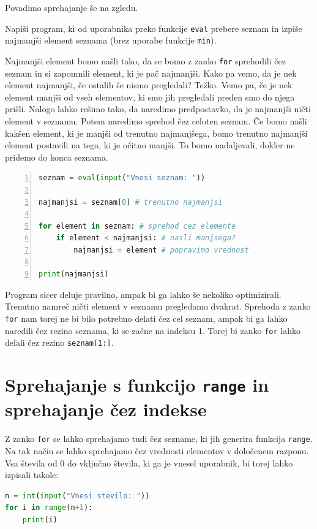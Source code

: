 Povadimo sprehajanje še na zgledu.
\begin{zgled}
Napiši program, ki od uporabnika preko funkcije \texttt{eval} prebere seznam in izpiše najmanjši element seznama (brez uporabe funkcije \texttt{min}). 
\end{zgled}
\begin{resitev}
Najmanjši element bomo našli tako, da se bomo z zanko \texttt{for} sprehodili čez seznam in si zapomnili element, ki je pač najmanjši. Kako pa vemo, da je nek element najmanjši, če ostalih še nismo pregledali? Težko. Vemo pa, če je nek element manjši od vseh elementov, ki smo jih pregledali preden smo do njega prišli. Nalogo lahko rešimo tako, da naredimo predpostavko, da je najmanjši ničti element v seznamu. Potem naredimo sprehod čez celoten seznam. Če bomo našli kakšen element, ki je manjši od trenutno najmanjšega, bomo trenutno najmanjši element postavili na tega, ki je očitno manjši. To bomo nadaljevali, dokler ne pridemo do konca seznama.
\begin{lstlisting}[language=Python, showstringspaces=false,numbers=left]
seznam = eval(input("Vnesi seznam: "))

najmanjsi = seznam[0] # trenutno najmanjsi

for element in seznam: # sprehod cez elemente
    if element < najmanjsi: # nasli manjsega?
        najmanjsi = element # popravimo vrednost

print(najmanjsi)
\end{lstlisting}
Program sicer deluje pravilno, ampak bi ga lahko še nekoliko optimizirali. Trenutno namreč ničti element v seznamu pregledamo dvakrat. Sprehoda z zanko \texttt{for} nam torej ne bi bilo potrebno delati čez cel seznam, ampak bi ga lahko naredili čez rezino seznama, ki se začne na indeksu 1. Torej bi zanko \texttt{for} lahko delali čez rezino \texttt{seznam[1:]}.
\end{resitev}

\section{Sprehajanje s funkcijo \texttt{range} in sprehajanje čez indekse}

Z zanko \texttt{for} se lahko sprehajamo tudi čez sezname, ki jih generira funkcija \texttt{range}. Na tak način se lahko sprehajamo čez vrednosti elementov v določenem razponu. Vsa števila od 0 do vključno števila, ki ga je vnesel uporabnik, bi torej lahko izpisali takole:
\begin{lstlisting}[language=Python, showstringspaces=false]
n = int(input("Vnesi stevilo: "))
for i in range(n+1):
    print(i)
\end{lstlisting}


